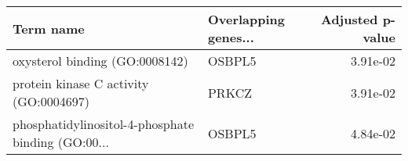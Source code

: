 \begin{tabular}{llr}
\toprule
                                         Term name & Overlapping genes... &  Adjusted p-value \\
\midrule
                    oxysterol binding (GO:0008142) &               OSBPL5 &          3.91e-02 \\
            protein kinase C activity (GO:0004697) &                PRKCZ &          3.91e-02 \\
phosphatidylinositol-4-phosphate binding (GO:00... &               OSBPL5 &          4.84e-02 \\
\bottomrule
\end{tabular}
